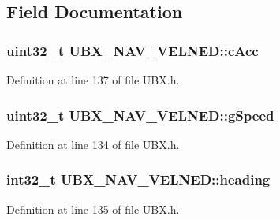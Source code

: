 \subsection{\-Field \-Documentation}
\hypertarget{struct_u_b_x___n_a_v___v_e_l_n_e_d_a8740fa2ac06cfb2d09b132c973a99887}{
\subsubsection[{c\-Acc}]{\setlength{\rightskip}{0pt plus 5cm}uint32\-\_\-t {\bf \-U\-B\-X\-\_\-\-N\-A\-V\-\_\-\-V\-E\-L\-N\-E\-D\-::c\-Acc}}}\label{struct_u_b_x___n_a_v___v_e_l_n_e_d_a8740fa2ac06cfb2d09b132c973a99887}


\-Definition at line 137 of file \-U\-B\-X.\-h.

\hypertarget{struct_u_b_x___n_a_v___v_e_l_n_e_d_a1c5f6e6ddf0495f4c308b520ae809266}{
\subsubsection[{g\-Speed}]{\setlength{\rightskip}{0pt plus 5cm}uint32\-\_\-t {\bf \-U\-B\-X\-\_\-\-N\-A\-V\-\_\-\-V\-E\-L\-N\-E\-D\-::g\-Speed}}}\label{struct_u_b_x___n_a_v___v_e_l_n_e_d_a1c5f6e6ddf0495f4c308b520ae809266}


\-Definition at line 134 of file \-U\-B\-X.\-h.

\hypertarget{struct_u_b_x___n_a_v___v_e_l_n_e_d_a1e0129270ba7fdbba7e441e60cefa8a7}{
\subsubsection[{heading}]{\setlength{\rightskip}{0pt plus 5cm}int32\-\_\-t {\bf \-U\-B\-X\-\_\-\-N\-A\-V\-\_\-\-V\-E\-L\-N\-E\-D\-::heading}}}\label{struct_u_b_x___n_a_v___v_e_l_n_e_d_a1e0129270ba7fdbba7e441e60cefa8a7}


\-Definition at line 135 of file \-U\-B\-X.\-h.

